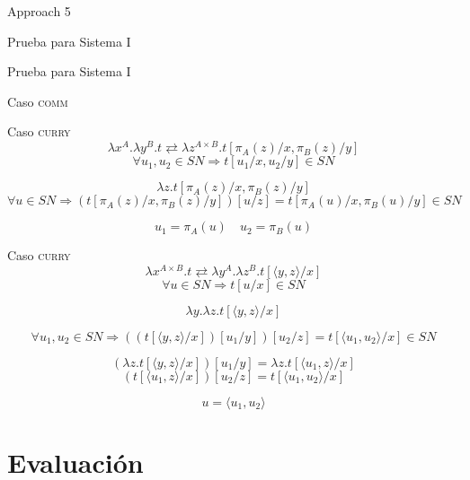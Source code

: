 \begin{frame}{Approach 5}
\end{frame}

\begin{frame}{Prueba para Sistema I}
	\pause
\end{frame}

\begin{frame}{Prueba para Sistema I}
\end{frame}

\begin{frame}{Caso \textsc{comm}}
\end{frame}

\begin{frame}{Caso \textsc{curry}}
	\[ \lambda x^A. \lambda y^B. t \rightleftarrows \lambda z^{A \times B}. t[\pi_A(z)/x, \pi_B(z)/y] \]
	\[ \forall u_1, u_2 \in SN \Longrightarrow t[u_1/x, u_2/y] \in SN \]
	
	\[ \lambda z. t[\pi_A(z)/x, \pi_B(z)/y]\]
	\[ \forall u \in SN \Longrightarrow (t[\pi_A(z)/x, \pi_B(z)/y])[u/z] = t[\pi_A(u)/x, \pi_B(u)/y] \in SN \]
	 
	\[ u_1 = \pi_A(u) \quad u_2 = \pi_B(u) \]
\end{frame}

\begin{frame}{Caso \textsc{curry}}
	\[ \lambda x^{A \times B}. t \rightleftarrows \lambda y^A. \lambda z^B. t[\langle y, z \rangle/x] \]
	\[ \forall u \in SN \Longrightarrow t[u/x] \in SN \]
	
	\[ \lambda y. \lambda z. t[\langle y, z \rangle/x]\]
	
	\[ \forall u_1,u_2 \in SN \Longrightarrow ((t[\langle y, z \rangle/x])[u_1/y])[u_2/z] = t[\langle u_1, u_2 \rangle/x] \in SN \]
	
	\[ (\lambda z. t[\langle y, z \rangle/x])[u_1/y] = \lambda z. t[\langle u_1, z \rangle/x] \]
	\[ (t[\langle u_1, z \rangle/x])[u_2/z] = t[\langle u_1, u_2 \rangle/x] \]
	
	\[ u = \langle u_1, u_2 \rangle \]
\end{frame}

\section{Evaluación}